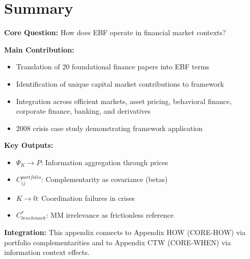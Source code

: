 %
%

\section{Summary}
\label{sec:Y-summary}

\begin{tcolorbox}[colback=green!10!white, colframe=green!75!black,
    title=\textbf{Appendix CIA: Summary}]

\textbf{Core Question:} How does EBF operate in financial market contexts?

\textbf{Main Contribution:}
\begin{itemize}[nosep]
    \item Translation of 20 foundational finance papers into EBF terms
    \item Identification of unique capital market contributions to framework
    \item Integration across efficient markets, asset pricing, behavioral finance,
          corporate finance, banking, and derivatives
    \item 2008 crisis case study demonstrating framework application
\end{itemize}

\textbf{Key Outputs:}
\begin{itemize}[nosep]
    \item $\Psi_K \to P$: Information aggregation through prices
    \item $C_{ij}^{portfolio}$: Complementarity as covariance (betas)
    \item $K \to 0$: Coordination failures in crises
    \item $C^*_{benchmark}$: MM irrelevance as frictionless reference
\end{itemize}

\textbf{Integration:} This appendix connects to Appendix HOW (CORE-HOW) via
portfolio complementarities and to Appendix CTW (CORE-WHEN) via information
context effects.

\end{tcolorbox}


